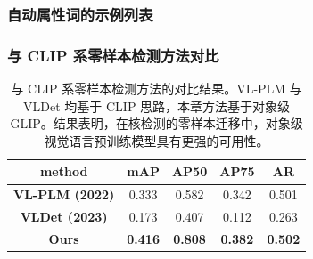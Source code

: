 \subsubsection{自动属性词的示例列表}
\begin{table}[htbp]
  \centering
  \caption{自动生成的 [shape] 与 [color] 属性词示例。第一行是 BLIP 生成的高频词；后续为语言模型扩充的同义词。}
  \label{tab:zeroshot_words}
\end{table}

\subsubsection{与 CLIP 系零样本检测方法对比}
\begin{table}[htbp]
  \centering
  \renewcommand{\arraystretch}{1.1}
  \caption{与 CLIP 系零样本检测方法的对比结果。VL-PLM \cite{zhao2022exploiting} 与 VLDet \cite{lin2022learning} 均基于 CLIP 思路，本章方法基于对象级 GLIP。结果表明，在核检测的零样本迁移中，对象级视觉语言预训练模型具有更强的可用性。}
  \label{tab:zeroshot_clip_compare}
  \begin{tabular}{c|cccc}
    \hline
    \textbf{method} & \textbf{mAP} & \textbf{AP50} & \textbf{AP75} & \textbf{AR} \\ \hline
    \textbf{VL-PLM (2022)} & 0.333 & 0.582 & 0.342 & 0.501 \\
    \textbf{VLDet (2023)}  & 0.173 & 0.407 & 0.112 & 0.263 \\ \hline
    \textbf{Ours}          & \textbf{0.416} & \textbf{0.808} & \textbf{0.382} & \textbf{0.502} \\ \hline
  \end{tabular}
\end{table}

